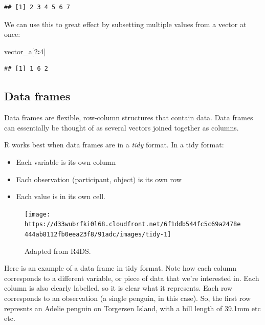 \documentclass[
]{book}
\newenvironment{Shaded}{\begin{snugshade}}{\end{snugshade}}
\newcommand{\DecValTok}[1]{\textcolor[rgb]{0.00,0.00,0.81}{#1}}
\newcommand{\NormalTok}[1]{#1}
\newcommand{\SpecialCharTok}[1]{\textcolor[rgb]{0.81,0.36,0.00}{\textbf{#1}}}
\providecommand{\tightlist}{%
  \setlength{\itemsep}{0pt}\setlength{\parskip}{0pt}}
\begin{document}
\begin{verbatim}
## [1] 2 3 4 5 6 7
\end{verbatim}

We can use this to great effect by subsetting multiple values from a vector at once:

\begin{Shaded}
\begin{Highlighting}[]
\NormalTok{vector\_a[}\DecValTok{2}\SpecialCharTok{:}\DecValTok{4}\NormalTok{]}
\end{Highlighting}
\end{Shaded}

\begin{verbatim}
## [1] 1 6 2
\end{verbatim}

\subsection{Data frames}\label{dataframes}

Data frames are flexible, row-column structures that contain data. Data frames can essentially be thought of as several vectors joined together as columns.

R works best when data frames are in a \emph{tidy} format. In a tidy format:

\begin{itemize}
\tightlist
\item
  Each variable is its own column
\item
  Each observation (participant, object) is its own row
\item
  Each value is in its own cell.
\end{itemize}

\begin{figure}

{\centering \texttt{[image: https://d33wubrfki0l68.cloudfront.net/6f1ddb544fc5c69a2478e444ab8112fb0eea23f8/91adc/images/tidy-1]} 

}

\caption{Adapted from R4DS.}\label{fig:unnamed-chunk-21}
\end{figure}

Here is an example of a data frame in tidy format. Note how each column corresponds to a different variable, or piece of data that we're interested in. Each column is also clearly labelled, so it is clear what it represents. Each row corresponds to an observation (a single penguin, in this case). So, the first row represnts an Adelie penguin on Torgersen Island, with a bill length of 39.1mm etc etc.
\end{document}
